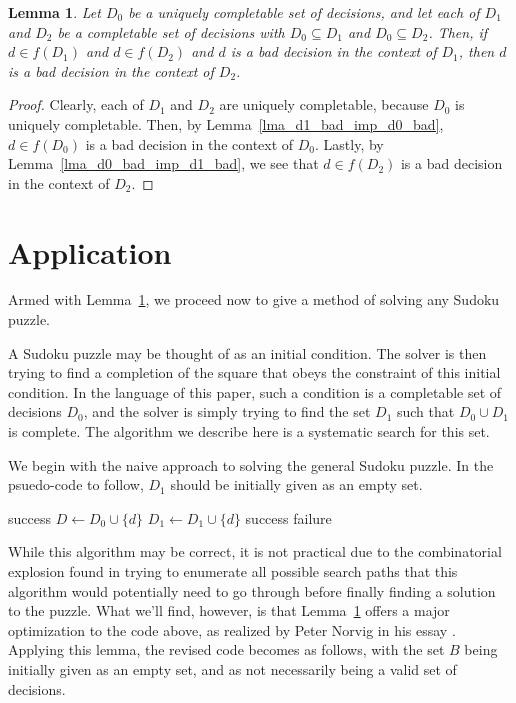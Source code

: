 \documentclass[12pt]{article}
\numberwithin{equation}{section}
\newtheorem{lemma}{Lemma}[section]
\begin{document}
\begin{lemma}\label{lma_bad_decision}
Let $D_0$ be a uniquely completable set of decisions, and let each of $D_1$ and $D_2$ be
a completable set of decisions with $D_0\subseteq D_1$ and $D_0\subseteq D_2$.
Then, if $d\in f(D_1)$ and $d\in f(D_2)$ and $d$ is a bad decision in the context of $D_1$, then $d$
is a bad decision in the context of $D_2$.
\end{lemma}
\begin{proof}
Clearly, each of $D_1$ and $D_2$ are uniquely completable, because $D_0$ is uniquely completable.
Then, by Lemma~\ref{lma_d1_bad_imp_d0_bad}, $d\in f(D_0)$ is a bad decision in the
context of $D_0$.  Lastly, by Lemma~\ref{lma_d0_bad_imp_d1_bad}, we see
that $d\in f(D_2)$ is a bad decision in the context of $D_2$.
\end{proof}

\section{Application}

Armed with Lemma~\ref{lma_bad_decision}, we proceed now to give a method
of solving any Sudoku puzzle.

A Sudoku puzzle may be thought of as an initial condition.  The solver is then
trying to find a completion of the square that obeys the constraint of this
initial condition.  In the language of this paper, such a condition is a
completable set of decisions $D_0$, and the solver is simply trying to find the
set $D_1$ such that $D_0\cup D_1$ is complete.  The algorithm we describe here
is a systematic search for this set.

We begin with the naive approach to solving the general Sudoku puzzle.
In the psuedo-code to follow, $D_1$ should be initially given as an empty set.

\begin{algorithmic}
		\State \Return success
	\EndIf
		\State $D\gets D_0\cup\{d\}$
			\State $D_1\gets D_1\cup\{d\}$
			\State \Return success
		\EndIf
	\EndFor
	\State \Return failure
\EndFunction
\end{algorithmic}

While this algorithm may be correct, it is not practical due to the combinatorial
explosion found in trying to enumerate all possible search paths that this algorithm
would potentially need to go through before finally finding a solution to the puzzle.
What we'll find, however, is that Lemma~\ref{lma_bad_decision} offers a major optimization to the
code above, as realized by Peter Norvig in his essay \cite{}.  Applying this lemma, the revised
code becomes as follows, with the set $B$ being initially given as an empty set, and as
not necessarily being a valid set of decisions.
\end{document}
